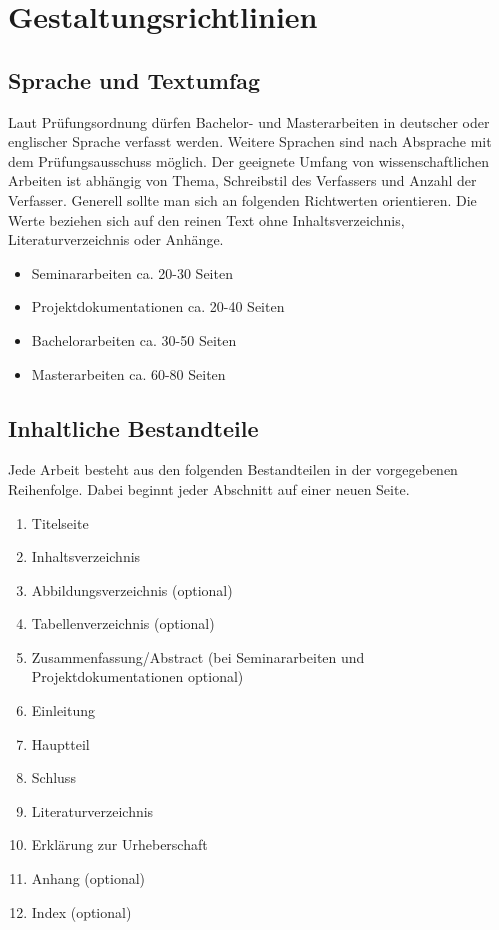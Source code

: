 \chapter{Gestaltungsrichtlinien}\label{sec:gestaltungsrichtlinien}

\section{Sprache und Textumfag}\label{subsec:sprache_textumfang}

Laut Prüfungsordnung dürfen Bachelor- und Masterarbeiten in deutscher oder englischer Sprache verfasst werden.
Weitere Sprachen sind nach Absprache mit dem Prüfungsausschuss möglich.
Der geeignete Umfang von wissenschaftlichen Arbeiten ist abhängig von Thema, Schreibstil des Verfassers und Anzahl der Verfasser.
Generell sollte man sich an folgenden Richtwerten orientieren.
Die Werte beziehen sich auf den reinen Text ohne Inhaltsverzeichnis, Literaturverzeichnis oder Anhänge.

\begin{itemize}
    \item{Seminararbeiten ca. 20-30 Seiten}
    \item{Projektdokumentationen ca. 20-40 Seiten}
    \item{Bachelorarbeiten ca. 30-50 Seiten}
    \item{Masterarbeiten ca. 60-80 Seiten}
\end{itemize}

\section{Inhaltliche Bestandteile}\label{subsec:inhaltliche_bestandteile}

Jede Arbeit besteht aus den folgenden Bestandteilen in der vorgegebenen Reihenfolge.
Dabei beginnt jeder Abschnitt auf einer neuen Seite. 

\begin{enumerate}
    \item{Titelseite}
    \item{Inhaltsverzeichnis}
    \item{Abbildungsverzeichnis (optional)}
    \item{Tabellenverzeichnis (optional)}
    \item{Zusammenfassung/Abstract (bei Seminararbeiten und Projektdokumentationen optional)}
    \item{Einleitung}
    \item{Hauptteil}
    \item{Schluss}
    \item{Literaturverzeichnis}
    \item{Erklärung zur Urheberschaft}
    \item{Anhang (optional)}
    \item{Index (optional)}
\end{enumerate}

